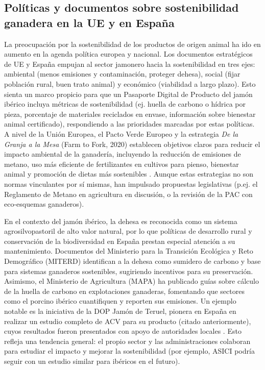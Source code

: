 \subsection{Políticas y documentos sobre sostenibilidad ganadera en la UE y en España}
La preocupación por la sostenibilidad de los productos de origen animal ha ido en aumento en la agenda política europea y nacional. Los documentos estratégicos de UE y España empujan al sector jamonero hacia la sostenibilidad en tres ejes: ambiental (menos emisiones y contaminación, proteger dehesa), social (fijar población rural, buen trato animal) y económico (viabilidad a largo plazo). Esto sienta un marco propicio para que un Pasaporte Digital de Producto del jamón ibérico incluya métricas de sostenibilidad (ej. huella de carbono o hídrica por pieza, porcentaje de materiales reciclados en envase, información sobre bienestar animal certificado), respondiendo a las prioridades marcadas por estas políticas. A nivel de la Unión Europea, el Pacto Verde Europeo y la estrategia \textit{De la Granja a la Mesa} (Farm to Fork, 2020) establecen objetivos claros para reducir el impacto ambiental de la ganadería, incluyendo la reducción de emisiones de metano, uso más eficiente de fertilizantes en cultivos para pienso, bienestar animal y promoción de dietas más sostenibles \cite{noauthor_farm_nodate} \cite{noauthor_sistema_nodate}. Aunque estas estrategias no son normas vinculantes por sí mismas, han impulsado propuestas legislativas (p.ej. el Reglamento de Metano en agricultura en discusión, o la revisión de la PAC con eco-esquemas ganaderos).

En el contexto del jamón ibérico, la dehesa es reconocida como un sistema agrosilvopastoril de alto valor natural, por lo que políticas de desarrollo rural y conservación de la biodiversidad en España prestan especial atención a su mantenimiento. Documentos del Ministerio para la Transición Ecológica y Reto Demográfico (MITERD) identifican a la dehesa como sumidero de carbono y base para sistemas ganaderos sostenibles, sugiriendo incentivos para su preservación. Asimismo, el Ministerio de Agricultura (MAPA) ha publicado guías sobre cálculo de la huella de carbono en explotaciones ganaderas, fomentando que sectores como el porcino ibérico cuantifiquen y reporten sus emisiones. Un ejemplo notable es la iniciativa de la DOP Jamón de Teruel, pionera en España en realizar un estudio completo de ACV para su producto (citado anteriormente), cuyos resultados fueron presentados con apoyo de autoridades locales \cite{noauthor_producir_nodate}. Esto refleja una tendencia general: el propio sector y las administraciones colaboran para estudiar el impacto y mejorar la sostenibilidad (por ejemplo, ASICI podría seguir con un estudio similar para ibéricos en el futuro).

